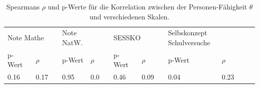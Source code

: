 \begin{table}[htbp]
  \centering
\begin{tabular}{@{}lllllllllll@{}}
\toprule
   \multicolumn{2}{l}{Note Mathe} &&  \multicolumn{2}{l}{Note NatW.}&&  \multicolumn{2}{l}{SESSKO}&&  \multicolumn{2}{l}{Selbskonzept Schulversuche}\\ 
      \cmidrule{1-2}\cmidrule{4-5}\cmidrule{7-8}\cmidrule{10-11}
   p-Wert & $\rho$ && p-Wert & $\rho$  && p-Wert & $\rho$&& p-Wert & $\rho$\\ 
\midrule
   0.16 & 0.17 && 0.95 & 0.0 && 0.46 & 0.09 && 0.04 & 0.23    \\ 

\bottomrule
\end{tabular} 
  \caption{Spearmans $\rho$ und p-Werte für die Korrelation zwischen der Personen-Fähigkeit $\theta$ und verschiedenen Skalen.  }
  \label{tab:CorPersonRasch}
\end{table}

